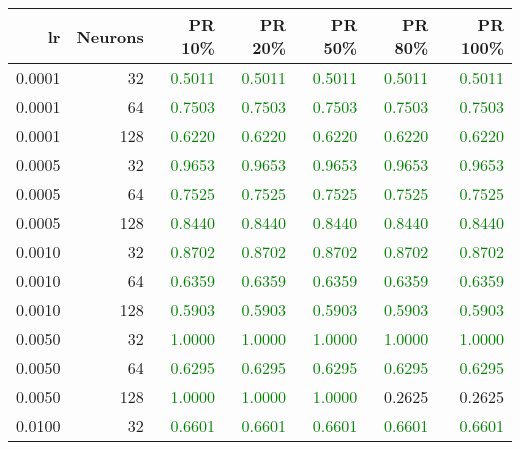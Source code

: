 \begin{tabular}{rrrrrrr}
\toprule
lr & Neurons & PR 10\% & PR 20\% & PR 50\% & PR 80\% & PR 100\% \\
\midrule
0.0001 & 32 & \textcolor{green} {0.5011} & \textcolor{green} {0.5011} & \textcolor{green} {0.5011} & \textcolor{green} {0.5011} & \textcolor{green} {0.5011} \\
0.0001 & 64 & \textcolor{green} {0.7503} & \textcolor{green} {0.7503} & \textcolor{green} {0.7503} & \textcolor{green} {0.7503} & \textcolor{green} {0.7503} \\
0.0001 & 128 & \textcolor{green} {0.6220} & \textcolor{green} {0.6220} & \textcolor{green} {0.6220} & \textcolor{green} {0.6220} & \textcolor{green} {0.6220} \\
0.0005 & 32 & \textcolor{green} {0.9653} & \textcolor{green} {0.9653} & \textcolor{green} {0.9653} & \textcolor{green} {0.9653} & \textcolor{green} {0.9653} \\
0.0005 & 64 & \textcolor{green} {0.7525} & \textcolor{green} {0.7525} & \textcolor{green} {0.7525} & \textcolor{green} {0.7525} & \textcolor{green} {0.7525} \\
0.0005 & 128 & \textcolor{green} {0.8440} & \textcolor{green} {0.8440} & \textcolor{green} {0.8440} & \textcolor{green} {0.8440} & \textcolor{green} {0.8440} \\
0.0010 & 32 & \textcolor{green} {0.8702} & \textcolor{green} {0.8702} & \textcolor{green} {0.8702} & \textcolor{green} {0.8702} & \textcolor{green} {0.8702} \\
0.0010 & 64 & \textcolor{green} {0.6359} & \textcolor{green} {0.6359} & \textcolor{green} {0.6359} & \textcolor{green} {0.6359} & \textcolor{green} {0.6359} \\
0.0010 & 128 & \textcolor{green} {0.5903} & \textcolor{green} {0.5903} & \textcolor{green} {0.5903} & \textcolor{green} {0.5903} & \textcolor{green} {0.5903} \\
0.0050 & 32 & \textcolor{green} {1.0000} & \textcolor{green} {1.0000} & \textcolor{green} {1.0000} & \textcolor{green} {1.0000} & \textcolor{green} {1.0000} \\
0.0050 & 64 & \textcolor{green} {0.6295} & \textcolor{green} {0.6295} & \textcolor{green} {0.6295} & \textcolor{green} {0.6295} & \textcolor{green} {0.6295} \\
0.0050 & 128 & \textcolor{green} {1.0000} & \textcolor{green} {1.0000} & \textcolor{green} {1.0000} & \textcolor{blu} {0.2625} & \textcolor{blu} {0.2625} \\
0.0100 & 32 & \textcolor{green} {0.6601} & \textcolor{green} {0.6601} & \textcolor{green} {0.6601} & \textcolor{green} {0.6601} & \textcolor{green} {0.6601} \\

\end{tabular}
